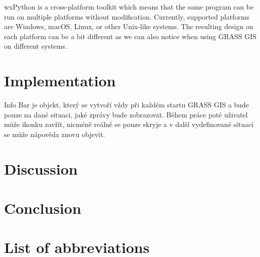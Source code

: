\documentclass[a4paper,10pt,twoside]{article}
\begin{document}
wxPython is a cross-platform toolkit which means that the same program can be run on multiple platforms without modification. Currently, supported platforms are Windows, macOS, Linux, or other Unix-like systems. The resulting design on each platform can be a bit different as we can also notice when using GRASS GIS on different systems. 


\newpage
\vspace*{-1cm}
\section{Implementation}
\noindent
\large


 Info Bar je objekt, který se vytvoří vždy při každém startu GRASS GIS a bude pouze na dané situaci, jaké zprávy bude zobrazovat. Během práce poté uživatel může ikonku zavřít, nicméně reálně se pouze skryje a v další vydefinované situaci se může nápověda znovu objevit.

\newpage
\vspace*{-1cm}
\section*{Discussion}
\noindent
\large

\newpage
\vspace*{-1cm}
\section*{Conclusion}
\noindent
\large

\newpage
\vspace*{-1cm}
\section*{List of abbreviations}
\noindent
\large
\end{document}
